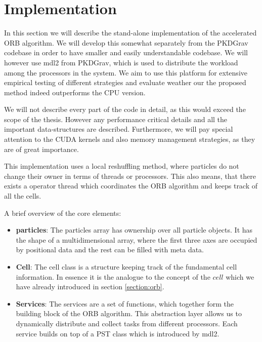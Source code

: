 \documentclass[]{article}
\begin{document}
\newpage
\section{Implementation}

In this section we will describe the stand-alone implementation of the accelerated ORB algorithm. We will develop this somewhat separately from the PKDGrav codebase in order to have smaller and easily understandable codebase. We will however use mdl2 from PKDGrav, which is used to distribute the workload among the processors in the system. We aim to use this platform for extensive empirical testing of different strategies and evaluate weather our the proposed method indeed outperforms the CPU version. 

We will not describe every part of the code in detail, as this would exceed the scope of the thesis. However any performance critical details and all the important data-structures are described. Furthermore, we will pay special attention to the CUDA kernels and also memory management strategies, as they are of great importance.

This implementation uses a local reshuffling method, where particles do not change their owner in terms of threads or processors. This also means, that there exists a operator thread which coordinates the ORB algorithm and keeps track of all the cells.

A brief overview of the core elements:

\begin{itemize}
	\item \textbf{particles}: The particles array has ownership over all particle objects. It has the shape of a multidimensional array, where the first three axes are occupied by positional data and the rest can be filled with meta data.
	\item \textbf{Cell}: The cell class is a structure keeping track of the fundamental cell information. In essence it is the analogue to the concept of the $cell$ which we have already introduced in section \ref{section:orb}.
	\item \textbf{Services}: The services are a set of functions, which together form the building block of the ORB algorithm. This abstraction layer allows us to dynamically distribute and collect tasks from different processors. Each service builds on top of a PST class which is introduced by mdl2.
	
\end{itemize}
\end{document}
